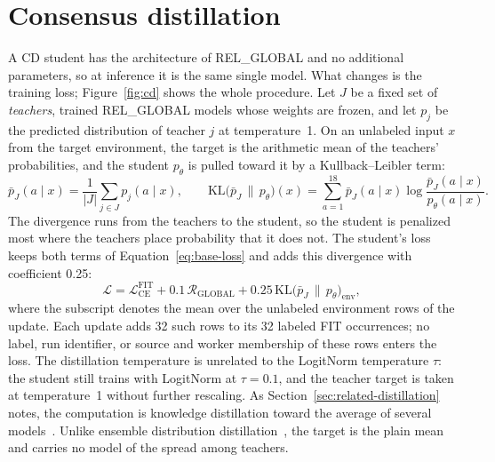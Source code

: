 \section{Consensus distillation}
\label{sec:method-cd}

A CD student has the architecture of REL\_GLOBAL and no additional
parameters, so at inference it is the same single model. What changes
is the training loss; Figure~\ref{fig:cd} shows the whole procedure. Let $J$ be a fixed set of \emph{teachers},
trained REL\_GLOBAL models whose weights are frozen, and let $p_j$ be
the predicted distribution of teacher $j$ at temperature~1. On an
unlabeled input $x$ from the target environment, the target is the
arithmetic mean of the teachers' probabilities, and the student
$p_\theta$ is pulled toward it by a Kullback--Leibler term:
\begin{equation}
  \bar{p}_J(a\mid x)=\frac{1}{|J|}\sum_{j\in J}p_j(a\mid x),
  \qquad
  \mathrm{KL}\bigl(\bar{p}_J \,\|\, p_\theta\bigr)(x)
  =\sum_{a=1}^{18}\bar{p}_J(a\mid x)
   \log\frac{\bar{p}_J(a\mid x)}{p_\theta(a\mid x)} .
  \label{eq:cd-target}
\end{equation}
The divergence runs from the teachers to the student, so the student is
penalized most where the teachers place probability that it does not.
The student's loss keeps both terms of Equation~\ref{eq:base-loss} and
adds this divergence with coefficient 0.25:
\begin{equation}
  \mathcal{L}
  = \mathcal{L}^{\mathrm{FIT}}_{\mathrm{CE}}
  + 0.1\,\mathcal{R}_{\mathrm{GLOBAL}}
  + 0.25\,\mathrm{KL}\bigl(\bar{p}_J \,\|\, p_\theta\bigr)_{\mathrm{env}} ,
  \label{eq:cd-loss}
\end{equation}
where the subscript denotes the mean over the unlabeled environment
rows of the update. Each update adds 32 such rows to its 32 labeled FIT
occurrences; no label, run identifier, or source and worker
membership of these rows enters the loss. The distillation temperature
is unrelated to the LogitNorm temperature $\tau$: the student still
trains with LogitNorm at $\tau=0.1$, and the teacher target is taken at
temperature~1 without further rescaling. As
Section~\ref{sec:related-distillation} notes, the computation is
knowledge distillation toward the average of several
models~\cite{hinton2015distilling}. Unlike ensemble distribution
distillation~\cite{malinin2019ensemble}, the target is the plain mean
and carries no model of the spread among teachers.

